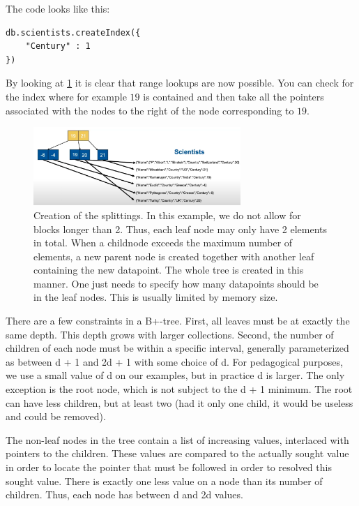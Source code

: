 The code looks like this:
\begin{lstlisting}[style=neutral]
db.scientists.createIndex({
    "Century" : 1
})
\end{lstlisting}

By looking at \cref{fig:BTrees2} it is clear that range lookups are now possible. You can check for the index where for example $19$ is contained and then take all the pointers associated with the nodes to the right of the node corresponding to $19$.

\begin{figure}[h]
    \centering
    \includegraphics[width=0.7\textwidth]{Figures/BTrees.png}
    \caption{Creation of the splittings. In this example, we do not allow for blocks longer than 2. Thus, each leaf node may only have 2 elements in total. When a childnode exceeds the maximum number of elements, a new parent node is created together with another leaf containing the new datapoint. The whole tree is created in this manner. One just needs to specify how many datapoints should be in the leaf nodes. This is usually limited by memory size.}\label{fig:BTrees2}
\end{figure}

There are a few constraints in a B+-tree. First, all leaves must be at exactly the same depth. This depth grows with larger collections. Second, the number of children of each node must be within a specific interval, generally parameterized as between d + 1 and 2d + 1 with some choice of d. For pedagogical purposes, we use a small value of d on our examples, but in practice d is larger. The only exception is the root node, which is not subject to the d + 1 minimum. The root can have less children, but at least two (had it only one child, it would be useless and could be removed).

The non-leaf nodes in the tree contain a list of increasing values, interlaced with pointers to the children. These values are compared to the actually sought value in order to locate the pointer that must be followed in order to resolved this sought value. There is exactly one less value on a node than its number of children. Thus, each node has between d and 2d values.

